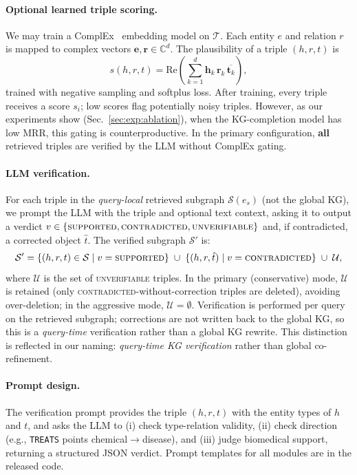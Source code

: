\paragraph{Optional learned triple scoring.}
We may train a ComplEx~\cite{trouillon2016complex} embedding model on $\mathcal{T}$. Each entity $e$ and relation $r$ is mapped to complex vectors $\mathbf{e},\mathbf{r}\in\mathbb{C}^d$. The plausibility of a triple $(h,r,t)$ is
\begin{equation}
  \label{eq:complex}
  s(h,r,t) = \mathrm{Re}\!\left(\sum_{k=1}^{d} \mathbf{h}_k\,\mathbf{r}_k\,\overline{\mathbf{t}_k}\right),
\end{equation}
trained with negative sampling and softplus loss. After training, every triple receives a score $s_i$; low scores flag potentially noisy triples. However, as our experiments show (Sec.~\ref{sec:exp:ablation}), when the KG-completion model has low MRR, this gating is counterproductive. In the primary configuration, \textbf{all} retrieved triples are verified by the LLM without ComplEx gating.

\paragraph{LLM verification.}
For each triple in the \emph{query-local} retrieved subgraph $\mathcal{S}(e_s)$ (not the global KG), we prompt the LLM with the triple and optional text context, asking it to output a verdict $v\in\{\textsc{supported},\textsc{contradicted},\textsc{unverifiable}\}$ and, if contradicted, a corrected object $\hat{t}$. The verified subgraph $\mathcal{S}'$ is:
\begin{equation}
  \mathcal{S}' = \{(h,r,t)\in\mathcal{S}\mid v=\textsc{supported}\}\;\cup\;\{(h,r,\hat{t})\mid v=\textsc{contradicted}\}\;\cup\;\mathcal{U},
\end{equation}
where $\mathcal{U}$ is the set of \textsc{unverifiable} triples. In the primary (conservative) mode, $\mathcal{U}$ is retained (only \textsc{contradicted}-without-correction triples are deleted), avoiding over-deletion; in the aggressive mode, $\mathcal{U}=\emptyset$. Verification is performed per query on the retrieved subgraph; corrections are not written back to the global KG, so this is a \emph{query-time} verification rather than a global KG rewrite. This distinction is reflected in our naming: \emph{query-time KG verification} rather than global co-refinement.

\paragraph{Prompt design.}
The verification prompt provides the triple $(h, r, t)$ with the entity types of $h$ and $t$, and asks the LLM to (i) check type-relation validity, (ii) check direction (e.g., \texttt{TREATS} points chemical$\to$disease), and (iii) judge biomedical support, returning a structured JSON verdict. Prompt templates for all modules are in the released code.


